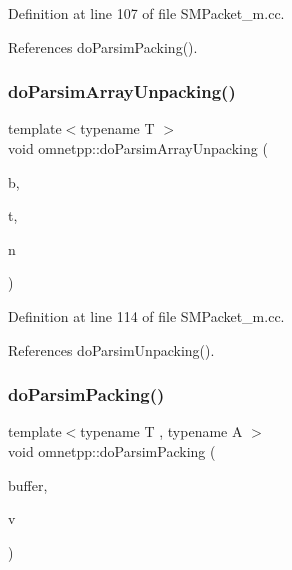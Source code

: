 Definition at line 107 of file S\+M\+Packet\+\_\+m.\+cc.



References do\+Parsim\+Packing().

\mbox{\label{namespaceomnetpp_aace4e02d3cd181249cf81a4bf8827fa7}} 
\subsubsection{\texorpdfstring{do\+Parsim\+Array\+Unpacking()}{doParsimArrayUnpacking()}}
{\footnotesize\ttfamily template$<$typename T $>$ \\
void omnetpp\+::do\+Parsim\+Array\+Unpacking (\begin{DoxyParamCaption}\item[{omnetpp\+::c\+Comm\+Buffer $\ast$}]{b,  }\item[{T $\ast$}]{t,  }\item[{int}]{n }\end{DoxyParamCaption})}



Definition at line 114 of file S\+M\+Packet\+\_\+m.\+cc.



References do\+Parsim\+Unpacking().

\mbox{\label{namespaceomnetpp_aa55507da29724bc32cb1377349b22c87}} 
\subsubsection{\texorpdfstring{do\+Parsim\+Packing()}{doParsimPacking()}\hspace{0.1cm}{\footnotesize\ttfamily [1/5]}}
{\footnotesize\ttfamily template$<$typename T , typename A $>$ \\
void omnetpp\+::do\+Parsim\+Packing (\begin{DoxyParamCaption}\item[{omnetpp\+::c\+Comm\+Buffer $\ast$}]{buffer,  }\item[{const std\+::vector$<$ T, A $>$ \&}]{v }\end{DoxyParamCaption})}



